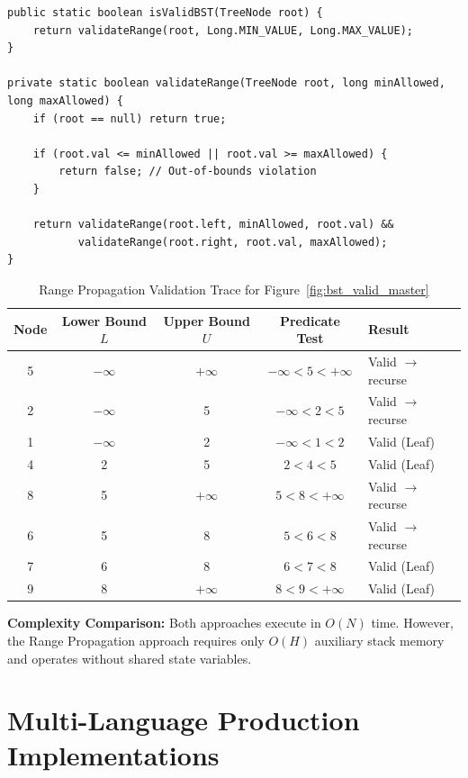 \documentclass[10pt,journal,compsoc,onecolumn]{IEEEtran}
\begin{document}
\begin{verbatim}
public static boolean isValidBST(TreeNode root) {
    return validateRange(root, Long.MIN_VALUE, Long.MAX_VALUE);
}

private static boolean validateRange(TreeNode root, long minAllowed, long maxAllowed) {
    if (root == null) return true;

    if (root.val <= minAllowed || root.val >= maxAllowed) {
        return false; // Out-of-bounds violation
    }

    return validateRange(root.left, minAllowed, root.val) &&
           validateRange(root.right, root.val, maxAllowed);
}
\end{verbatim}

\begin{table}[htbp]
\centering
\caption{Range Propagation Validation Trace for Figure~\ref{fig:bst_valid_master}}
\label{tab:validation_trace}
\begin{tabular}{ccccl}
\toprule
\textbf{Node} & \textbf{Lower Bound $L$} & \textbf{Upper Bound $U$} & \textbf{Predicate Test} & \textbf{Result} \\
\midrule
5 & $-\infty$ & $+\infty$ & $-\infty < 5 < +\infty$ & Valid $\to$ recurse \\
2 & $-\infty$ & 5 & $-\infty < 2 < 5$ & Valid $\to$ recurse \\
1 & $-\infty$ & 2 & $-\infty < 1 < 2$ & Valid (Leaf) \\
4 & 2 & 5 & $2 < 4 < 5$ & Valid (Leaf) \\
8 & 5 & $+\infty$ & $5 < 8 < +\infty$ & Valid $\to$ recurse \\
6 & 5 & 8 & $5 < 6 < 8$ & Valid $\to$ recurse \\
7 & 6 & 8 & $6 < 7 < 8$ & Valid (Leaf) \\
9 & 8 & $+\infty$ & $8 < 9 < +\infty$ & Valid (Leaf) \\
\bottomrule
\end{tabular}
\end{table}

\textbf{Complexity Comparison:} Both approaches execute in $O(N)$ time. However, the Range Propagation approach requires only $O(H)$ auxiliary stack memory and operates without shared state variables.

\section{Multi-Language Production Implementations}
\label{sec:implementations}
\end{document}

